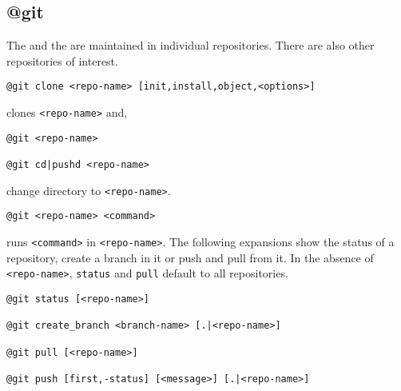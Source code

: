 \subsection{@git}
\label{git}

The  and the  are maintained in individual repositories. There are also other repositories of interest.
%
\begin{verbatim}
@git clone <repo-name> [init,install,object,<options>]
\end{verbatim}
%
clones \texttt{<repo-name>} and,
%
\begin{verbatim}
@git <repo-name>

@git cd|pushd <repo-name>
\end{verbatim}
%
change directory to \texttt{<repo-name>}.
%
\begin{verbatim}
@git <repo-name> <command>
\end{verbatim}
%
runs \texttt{<command>} in \texttt{<repo-name>}. The following expansions show the status of a repository, create a branch in it or push and pull from it. In the absence of \texttt{<repo-name>}, \texttt{status} and \texttt{pull} default to all repositories.
%
\begin{verbatim}
@git status [<repo-name>]

@git create_branch <branch-name> [.|<repo-name>]

@git pull [<repo-name>]

@git push [first,-status] [<message>] [.|<repo-name>]
\end{verbatim}